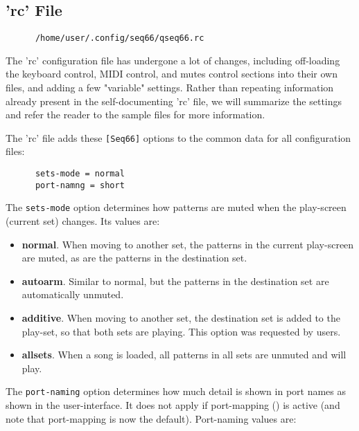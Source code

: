 \subsection{'rc' File}
\label{subsec:configuration_rc}

   \begin{verbatim}
      /home/user/.config/seq66/qseq66.rc
   \end{verbatim}

   The 'rc' configuration file has undergone a lot of changes, including
   off-loading the keyboard control, MIDI control, and mutes control sections
   into their own files, and adding a few "variable" settings.
   Rather than repeating information already present in the self-documenting
   'rc' file, we will summarize the settings and refer the reader to the sample
   files for more information.

   The 'rc' file adds these \texttt{[Seq66]} options to the common
   data for all configuration files:

   \begin{verbatim}
      sets-mode = normal
      port-namng = short
   \end{verbatim}

   The \texttt{sets-mode} option determines how patterns are muted when the
   play-screen (current set) changes.  Its values are:

   \begin{itemize}
      \item \textbf{normal}.
         When moving to another set, the patterns in the
         current play-screen are muted, as are the patterns in the destination
         set.
      \item \textbf{autoarm}.
         Similar to normal, but the patterns in the
         destination set are automatically unmuted.
      \item \textbf{additive}.
         When moving to another set, the destination set
         is added to the play-set, so that both sets are playing.
         This option was requested by users.
      \item \textbf{allsets}.
         When a song is loaded, all patterns in all sets are unmuted and will
         play.
   \end{itemize}

   The \texttt{port-naming} option determines how much detail is shown in
   port names as shown in the user-interface.  It does not apply if
   port-mapping () is active (and note that
   port-mapping is now the default).
   Port-naming values are:

